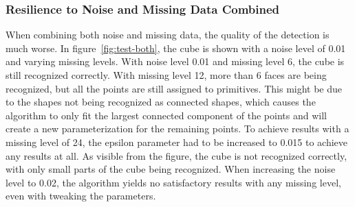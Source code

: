 \subsubsection{Resilience to Noise and Missing Data Combined}

When combining both noise and missing data, the quality of the detection is much worse.
In figure~\ref{fig:test-both}, the cube is shown with a noise level of 0.01 and varying missing levels.
With noise level 0.01 and missing level 6, the cube is still recognized correctly.
With missing level 12, more than 6 faces are being recognized, but all the points are still assigned to primitives.
This might be due to the shapes not being recognized as connected shapes,
which causes the algorithm to only fit the largest connected component of the points and will create a new parameterization
for the remaining points.
To achieve results with a missing level of 24, the epsilon parameter had to be increased to 0.015 to achieve any results at all.
As visible from the figure, the cube is not recognized correctly, with only small parts of the cube being recognized.
When increasing the noise level to 0.02, the algorithm yields no satisfactory results with any missing level, even with tweaking the parameters.

